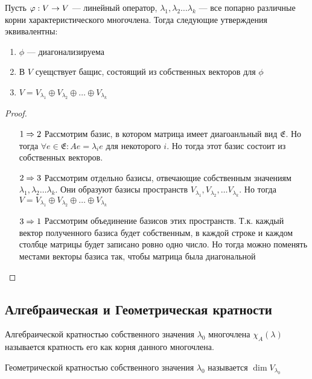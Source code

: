 \begin{theorem}
    Пусть \(\varphi: V \rightarrow V\) --- линейный оператор, \(\lambda_1, \lambda_2 \dots \lambda_k\) --- все попарно различные корни характеристического многочлена. Тогда следующие утверждения эквивалентны:
    \begin{enumerate}
        \item \(\phi\) --- диагонализируема
        \item В \(V\) суещствует бащис, состоящий из собственных векторов для \(\phi\)
        \item \(V = V_{\lambda_1} \oplus V_{\lambda_2} \oplus \dots \oplus V_{\lambda_k}\)
    \end{enumerate}
\end{theorem}
\begin{proof}\indent
    \begin{enumerate}
        \item[\(1 \Rightarrow 2\)] Рассмотрим базис, в котором матрица имеет диагоанльный вид \(\mathfrak{E}\). Но тогда \(\forall e \in \mathfrak{E}: Ae = \lambda_i e\) для некоторого \(i\). Но тогда этот базис состоит из собственных векторов.
        \item[\(2 \Rightarrow 3\)] Рассмотрим отдельно базисы, отвечающие собственным значениям \(\lambda_1, \lambda_2 \dots \lambda_k\). Они образуют базисы пространств \(V_{\lambda_1}, V_{\lambda_2}, \dots V_{\lambda_k}\). Но тогда \(V = V_{\lambda_1} \oplus V_{\lambda_2} \oplus \dots \oplus V_{\lambda_k}\)
        \item[\(3 \Rightarrow 1\)] Рассмотрим объединение базисов этих пространств. Т.к. каждый вектор полученного базиса будет собственным, в каждой строке и каждом столбце матрицы будет записано ровно одно число. Но тогда можно поменять местами векторы базиса так, чтобы матрица была диагональной
    \end{enumerate}   
\end{proof}

\subsection{Алгебраическая и Геометрическая кратности}
\begin{definition}
    Алгебраической кратностью собственного значения \(\lambda_0\) многочлена \(\chi_A(\lambda)\) называется кратность его как корня данного многочлена.
\end{definition}
\begin{definition}
    Геометрической кратностью собственного значения \(\lambda_0\) называется \(\dim V_{\lambda_0}\)
\end{definition}

